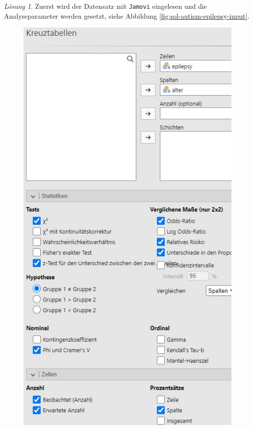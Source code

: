 \documentclass[
]{book}
\theoremstyle{definition}
\theoremstyle{definition}
\theoremstyle{definition}
\theoremstyle{definition}
\theoremstyle{remark}
\newtheorem*{solution}{Lösung}
\begin{document}
\begin{solution}

Zuerst wird der Datensatz mit \texttt{Jamovi} eingelesen und die
Analyseparameter werden gesetzt, siehe Abbildung
\ref{fig:sol-autism-epilepsy-input}.

\begin{figure}

{\centering \includegraphics{figures/09-exr-autism-epilepsy-jmv-input} 

}
\end{figure}
\end{solution}
\end{document}
